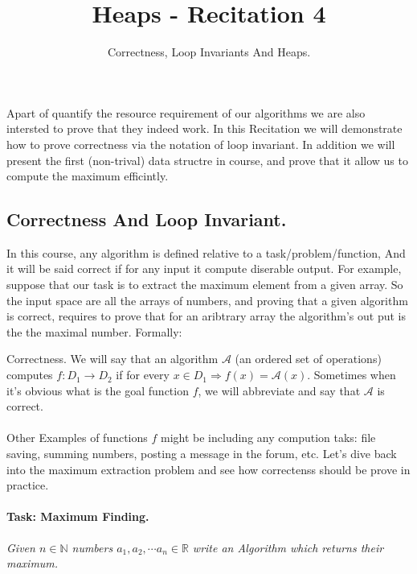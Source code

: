 \title{Heaps - Recitation 4} 
\author{Correctness, Loop Invariants And Heaps.}


  Apart of quantify the resource requirement of our algorithms we are also intersted to prove that they indeed work. In this Recitation we will demonstrate how to prove correctness via the notation of loop invariant. In addition we will present the first (non-trival) data structre in course, and prove that it allow us to compute the maximum efficintly.     
   


\subsection*{Correctness And Loop Invariant.}
In this course, any algorithm is defined relative to a task/problem/function, And it will be said correct if for any input it compute diserable output. For example, suppose that our task is to extract the maximum element from a given array.
So the input space are all the arrays of numbers, and proving that a given algorithm is correct, requires to prove that for an aribtrary array the algorithm's out put is the the maximal number. Formally:  

\begin{defbox}{Correctness.}
We will say that an algorithm \( \mathcal{A}\) (an ordered set of operations) computes \( f:D_1 \rightarrow D_2 \) if for every \(x \in D_1 \Rightarrow f(x) = \mathcal{A}(x)\). Sometimes when it's obvious what is the goal function \(f\), we will abbreviate and say that \( \mathcal{A}\) is correct.       
\end{defbox}
\paragraph{}
Other Examples of functions \(f\) might be including any compution taks: file saving, summing numbers, posting a message in the forum, etc. Let's dive back into the maximum extraction problem and see how correctenss should be prove in practice.     
\paragraph{Task: Maximum Finding.} \textit{Given $n\in \mathbb{N}$ numbers $a_1, a_2, \cdots a_n \in \mathbb{R}$ write an Algorithm which returns their maximum.} 


